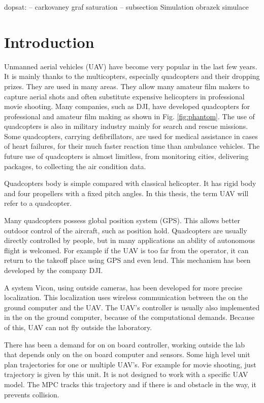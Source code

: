 \documentclass[a4paper,11pt,titlepage]{article}
\begin{document}
dopsat:
-- carkovaney graf saturation
-- subsection Simulation obrazek simulace

\section{Introduction}
Unmanned aerial vehicles (UAV) have become very popular in the last few years. It is mainly thanks to the multicopters, especially quadcopters and their dropping prizes. They are used in many areas. They allow many amateur film makers to capture aerial shots and often substitute expensive helicopters in professional movie shooting. Many companies, such as DJI, have developed quadcopters for professional and amateur film making as shown in Fig. \ref{fig:phantom}. The use of quadcopters is also in military industry mainly for search and rescue missions. Some quadcopters, carrying defibrillators, are used for medical assistance in cases of heart failures, for their much faster reaction time than ambulance vehicles. The future use of quadcopters is almost limitless, from monitoring cities, delivering packages, to collecting the air condition data. 

Quadcopters body is simple compared with classical helicopter. It has rigid body and four propellers with a fixed pitch angles. In this thesis, the term UAV will refer to a quadcopter.

Many quadcopters possess global position system (GPS). This allows better outdoor control of the aircraft, such as position hold. Quadcopters are usually directly controlled by people, but in many applications an ability of autonomous flight is welcomed. For example if the UAV is too far from the operator, it can return to the takeoff place using GPS and even lend. This mechanism has been developed by the company DJI. 

A system Vicon, using outside cameras, has been developed for more precise localization. This localization uses wireless communication between the on the ground computer and the UAV. The UAV's controller is usually also implemented in the on the ground computer, because of the computational demands. Because of this, UAV can not fly outside the laboratory. 

There has been a demand for on on board controller, working outside the lab that depends only on the on board computer and sensors. Some high level unit plan trajectories for one or multiple UAV's. For example for movie shooting, just trajectory is given by this unit. It is not designed to work with a specific UAV model. The MPC tracks this trajectory and if there is and obstacle in the way, it prevents collision.
\end{document}
